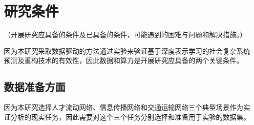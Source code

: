 



\section{研究条件}

（开展研究应具备的条件及已具备的条件，可能遇到的困难与问题和解决措施。）

因为本研究采取数据驱动的方法通过实验来验证基于深度表示学习的社会复杂系统预测及重构技术的有效性，因此数据和算力是开展研究应具备的两个关键条件。

\subsection{数据准备方面}

因为本研究选择人才流动网络、信息传播网络和交通运输网络三个典型场景作为实证分析的现实任务，因此需要对这个三个任务分别选择和准备用于实验的数据集。

